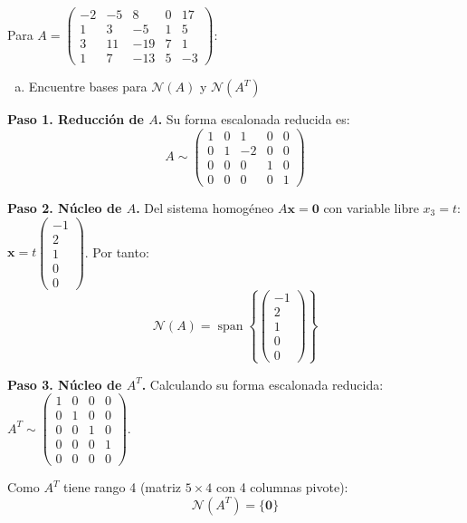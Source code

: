 \begin{prob} Para $A = \begin{pmatrix} -2 & -5 & 8 & 0 & 17 \\ 1 & 3 & -5 & 1 & 5 \\ 3 & 11 & -19 & 7 & 1 \\ 1 & 7 & -13 & 5 & -3 \end{pmatrix}$:
\begin{enumerate}[(a)]
\item Encuentre bases para $\mathcal{N}(A)$ y $\mathcal{N}(A^T)$
\end{enumerate}

\begin{myproof}
\textbf{Paso 1. Reducción de $A$.} Su forma escalonada reducida es:
$$A \sim \begin{pmatrix} 1 & 0 & 1 & 0 & 0 \\
0 & 1 & -2 & 0 & 0 \\
0 & 0 & 0 & 1 & 0 \\
0 & 0 & 0 & 0 & 1 \end{pmatrix}$$

\textbf{Paso 2. Núcleo de $A$.} Del sistema homogéneo $A\mathbf{x} = \mathbf{0}$ con variable libre $x_3=t:$ $\mathbf{x} = t\begin{pmatrix}-1\\2\\1\\0\\0\end{pmatrix}$. Por tanto:
$$\boxed{\mathcal{N}(A) = \operatorname{span}\left\{ \begin{pmatrix}-1\\2\\1\\0\\0\end{pmatrix}\right\}}$$

\textbf{Paso 3. Núcleo de $A^T$.} Calculando su forma escalonada reducida: $A^T \sim \begin{pmatrix} 1 & 0 & 0 & 0 \\ 0 & 1 & 0 & 0 \\ 0 & 0 & 1 & 0 \\ 0 & 0 & 0 & 1 \\ 0 & 0 & 0 & 0 \end{pmatrix}.$

Como $A^T$ tiene rango 4 (matriz $5 \times 4$ con 4 columnas pivote):
$$\boxed{\mathcal{N}(A^T) = \{\mathbf{0}\}}$$
\end{myproof}
\end{prob}

